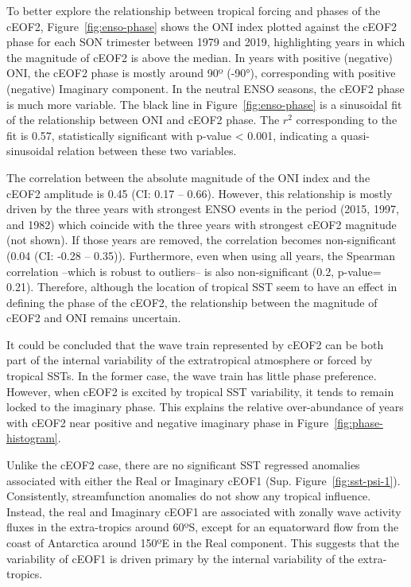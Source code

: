 \documentclass[smallextended]{svjour3}       %
\begin{document}
To better explore the relationship between tropical forcing and phases of the cEOF2, Figure~\ref{fig:enso-phase} shows the ONI index plotted against the cEOF2 phase for each SON trimester between 1979 and 2019, highlighting years in which the magnitude of cEOF2 is above the median.
In years with positive (negative) ONI, the cEOF2 phase is mostly around 90º (-90°), corresponding with positive (negative) Imaginary component.
In the neutral ENSO seasons, the cEOF2 phase is much more variable.
The black line in Figure~\ref{fig:enso-phase} is a sinusoidal fit of the relationship between ONI and cEOF2 phase.
The \(r^2\) corresponding to the fit is 0.57, statistically significant with p-value \textless{} 0.001, indicating a quasi-sinusoidal relation between these two variables.

The correlation between the absolute magnitude of the ONI index and the cEOF2 amplitude is 0.45 (CI: 0.17 -- 0.66).
However, this relationship is mostly driven by the three years with strongest ENSO events in the period (2015, 1997, and 1982) which coincide with the three years with strongest cEOF2 magnitude (not shown).
If those years are removed, the correlation becomes non-significant (0.04 (CI: -0.28 -- 0.35)).
Furthermore, even when using all years, the Spearman correlation --which is robust to outliers-- is also non-significant (0.2, p-value= 0.21).
Therefore, although the location of tropical SST seem to have an effect in defining the phase of the cEOF2, the relationship between the magnitude of cEOF2 and ONI remains uncertain.

It could be concluded that the wave train represented by cEOF2 can be both part of the internal variability of the extratropical atmosphere or forced by tropical SSTs.
In the former case, the wave train has little phase preference.
However, when cEOF2 is excited by tropical SST variability, it tends to remain locked to the imaginary phase.
This explains the relative over-abundance of years with cEOF2 near positive and negative imaginary phase in Figure~\ref{fig:phase-histogram}.

Unlike the cEOF2 case, there are no significant SST regressed anomalies associated with either the Real or Imaginary cEOF1 (Sup. Figure~\ref{fig:sst-psi-1}).
Consistently, streamfunction anomalies do not show any tropical influence.
Instead, the real and Imaginary cEOF1 are associated with zonally wave activity fluxes in the extra-tropics around 60ºS, except for an equatorward flow from the coast of Antarctica around 150ºE in the Real component.
This suggests that the variability of cEOF1 is driven primary by the internal variability of the extra-tropics.
\end{document}
